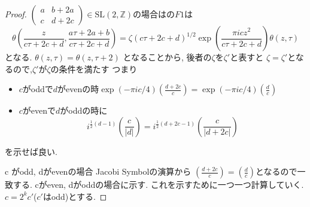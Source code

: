 \begin{proof}
$
\begin{pmatrix}
a & b + 2a \\ c  & d + 2c 
\end{pmatrix}
\in \mathrm{SL}(2, \mathbb{Z})
$の場合はの$F1$は
\begin{equation*}
\theta(\frac{z}{c \tau + 2c + d}, \frac{a\tau + 2a + b}{c 
\tau  + 2c + d}) = \zeta (c \tau +2c + d)^{1/2}\exp(\frac{\pi i c z^2}{c \tau + 2c + d})\theta(z, \tau )
\end{equation*}
となる.
$\theta(z, \tau) = \theta(z, \tau + 2)$
となることから,
後者の$\zeta$を$\zeta'$と表すと
$\zeta = \zeta'$となるので,$\zeta'$が$\zeta$の条件を満たす
つまり
\begin{itemize}
    \item  $c$がoddで$d$がevenの時$\exp(- \pi i c /4) \left(\frac{d + 2c}{c}\right) = \exp(- \pi i c /4) \left(\frac{d}{c} \right)$
    \item $c$がevenで$d$がoddの時に
\begin{equation*}
  i^{\frac{1}{2}(d -1) }\left(\frac{c}{|d|} \right) = i^{\frac{1}{2}(d + 2c -1) }\left(\frac{c}{|d + 2c|}\right) 
\end{equation*}
\end{itemize}
を示せば良い.

c がodd, dがevenの場合
Jacobi Symbolの演算から
$(\frac{d + 2c}{c}) = (\frac{d}{c})$となるので一致する.
cがeven, dがoddの場合に示す.
これを示すために一つ一つ計算していく.
$c = 2^kc'$($c'$はodd)とする.


\end{proof}
